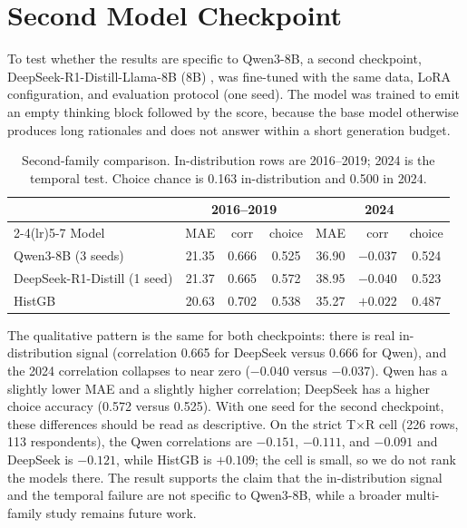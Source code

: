 \chapter{Second Model Checkpoint}
\label{app:second}

To test whether the results are specific to Qwen3-8B, a second checkpoint,
DeepSeek-R1-Distill-Llama-8B (8B) \citep{deepseek2025r1}, was fine-tuned with the
same data, LoRA
configuration, and evaluation protocol (one seed). The model was trained to emit
an empty thinking block followed by the score, because the base model otherwise
produces long rationales and does not answer within a short generation budget.

\begin{table}[h]
\centering
\small
\caption{Second-family comparison. In-distribution rows are 2016--2019; 2024 is
the temporal test. Choice chance is 0.163 in-distribution and 0.500 in 2024.}
\label{tab:second}
\begin{tabular}{lcccccc}
\toprule
& \multicolumn{3}{c}{2016--2019} & \multicolumn{3}{c}{2024} \\
\cmidrule(lr){2-4}\cmidrule(lr){5-7}
Model & MAE & corr & choice & MAE & corr & choice \\
\midrule
Qwen3-8B (3 seeds) & 21.35 & 0.666 & 0.525 & 36.90 & $-0.037$ & 0.524 \\
DeepSeek-R1-Distill (1 seed) & 21.37 & 0.665 & 0.572 & 38.95 & $-0.040$ & 0.523 \\
HistGB & 20.63 & 0.702 & 0.538 & 35.27 & $+0.022$ & 0.487 \\
\bottomrule
\end{tabular}
\end{table}

The qualitative pattern is the same for both checkpoints: there is real
in-distribution signal (correlation 0.665 for DeepSeek versus 0.666 for Qwen),
and the 2024 correlation collapses to near zero ($-0.040$ versus $-0.037$).
Qwen has a slightly lower MAE and a slightly higher correlation; DeepSeek has a
higher choice accuracy (0.572 versus 0.525). With one seed for the second
checkpoint, these differences should be read as descriptive. On the strict
T$\times$R cell (226 rows, 113 respondents), the Qwen correlations are $-0.151$,
$-0.111$, and $-0.091$ and DeepSeek is $-0.121$, while HistGB is $+0.109$; the
cell is small, so we do not rank the models there. The result supports the claim
that the in-distribution signal and the temporal failure are not specific to
Qwen3-8B, while a broader multi-family study remains future work.
